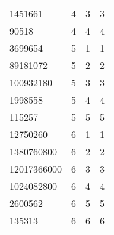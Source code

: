 \begin{table}[H]
\begin{tabular}{llll}
1451661                                     & 4                                      & 3                                      & 3                                            \\
90518                                       & 4                                      & 4                                      & 4                                            \\
3699654                                     & 5                                      & 1                                      & 1                                            \\
89181072                                    & 5                                      & 2                                      & 2                                            \\
100932180                                   & 5                                      & 3                                      & 3                                            \\
1998558                                     & 5                                      & 4                                      & 4                                            \\
115257                                      & 5                                      & 5                                      & 5                                            \\
12750260                                    & 6                                      & 1                                      & 1                                            \\
1380760800                                  & 6                                      & 2                                      & 2                                            \\
12017366000                                 & 6                                      & 3                                      & 3                                            \\
1024082800                                  & 6                                      & 4                                      & 4                                            \\
2600562                                     & 6                                      & 5                                      & 5                                            \\
135313                                      & 6                                      & 6                                      & 6                                            \\

\end{tabular}
\end{table}
